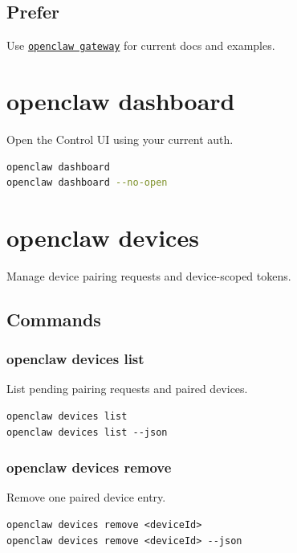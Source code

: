 \subsection{Prefer}


Use \href{/cli/gateway}{\texttt{openclaw gateway}} for current docs and examples.


\clearpage

\section{openclaw dashboard}


Open the Control UI using your current auth.

\begin{lstlisting}[language=bash]
openclaw dashboard
openclaw dashboard --no-open
\end{lstlisting}



\clearpage

\section{openclaw devices}


Manage device pairing requests and device-scoped tokens.

\subsection{Commands}


\subsubsection{openclaw devices list}


List pending pairing requests and paired devices.

\begin{lstlisting}
openclaw devices list
openclaw devices list --json
\end{lstlisting}


\subsubsection{openclaw devices remove }


Remove one paired device entry.

\begin{lstlisting}
openclaw devices remove <deviceId>
openclaw devices remove <deviceId> --json
\end{lstlisting}


